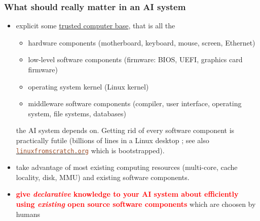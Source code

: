 \documentclass[xcolor=svgnames,final,smaller,a4]{beamer}
\begin{document}
 \begin{frame}
   \frametitle{What should really matter in an AI system}

   \begin{itemize}
   \item explicit some \href{https://en.wikipedia.org/wiki/Trusted_computing_base}{trusted computer base}, that is all the \begin{itemize}
   \item hardware components (motherboard, keyboard, mouse, screen, Ethernet)
   \item low-level software components (firmware: BIOS, UEFI, graphics card firmware)
   \item operating system kernel (Linux kernel)
   \item middleware software components (compiler, user interface,
     operating system, file systems, databases)
   \end{itemize}
     the AI system depends on. Getting rid of every software component is practically futile (billions of lines in a Linux desktop ; see also \href{http://linuxfromscratch.org/}{\texttt{\textcolor{Sienna}{linuxfromscratch.org}}} which is bootstrapped).

     \item take advantage of most existing computing resources
       (multi-core, cache locality, disk, MMU) and existing software
       components.

     \item \textcolor{red}{\textbf{give \emph{declarative} knowledge to your AI system about efficiently using \emph{existing} open source software components}} which are choosen by humans
   \end{itemize}
 \end{frame}
 
  
\end{document}

